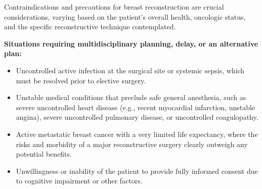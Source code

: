 Contraindications and precautions for breast reconstruction are crucial considerations, varying based on the patient's overall health, oncologic status, and the specific reconstructive technique contemplated.

\textbf{Situations requiring multidisciplinary planning, delay, or an alternative plan:}
\begin{itemize}
  \item Uncontrolled active infection at the surgical site or systemic sepsis, which must be resolved prior to elective surgery.
  \item Unstable medical conditions that preclude safe general anesthesia, such as severe uncontrolled heart disease (e.g., recent myocardial infarction, unstable angina), severe uncontrolled pulmonary disease, or uncontrolled coagulopathy.
  \item Active metastatic breast cancer with a very limited life expectancy, where the risks and morbidity of a major reconstructive surgery clearly outweigh any potential benefits.
  \item Unwillingness or inability of the patient to provide fully informed consent due to cognitive impairment or other factors.
\end{itemize}


